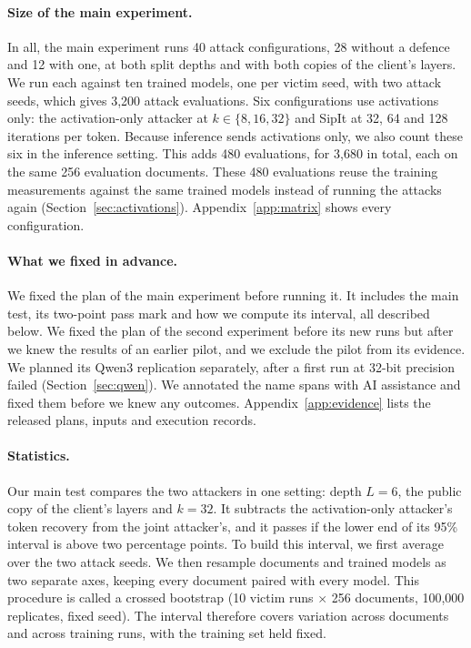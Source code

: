 \documentclass[11pt]{article}
\begin{document}
\paragraph{Size of the main experiment.}
In all, the main experiment runs 40 attack configurations, 28 without a defence and 12 with one, at both split depths and with both copies of the client's layers. We run each against ten trained models, one per victim seed, with two attack seeds, which gives 3{,}200 attack evaluations. Six configurations use activations only: the activation-only attacker at $k \in \{8, 16, 32\}$ and SipIt at 32, 64 and 128 iterations per token. Because inference sends activations only, we also count these six in the inference setting. This adds 480 evaluations, for 3{,}680 in total, each on the same 256 evaluation documents. These 480 evaluations reuse the training measurements against the same trained models instead of running the attacks again (Section~\ref{sec:activations}). Appendix~\ref{app:matrix} shows every configuration.

\paragraph{What we fixed in advance.}
We fixed the plan of the main experiment before running it. It includes the main test, its two-point pass mark and how we compute its interval, all described below. We fixed the plan of the second experiment before its new runs but after we knew the results of an earlier pilot, and we exclude the pilot from its evidence. We planned its Qwen3 replication separately, after a first run at 32-bit precision failed (Section~\ref{sec:qwen}). We annotated the name spans with AI assistance and fixed them before we knew any outcomes. Appendix~\ref{app:evidence} lists the released plans, inputs and execution records.

\paragraph{Statistics.}
Our main test compares the two attackers in one setting: depth $L{=}6$, the public copy of the client's layers and $k{=}32$. It subtracts the activation-only attacker's token recovery from the joint attacker's, and it passes if the lower end of its 95\% interval is above two percentage points. To build this interval, we first average over the two attack seeds. We then resample documents and trained models as two separate axes, keeping every document paired with every model. This procedure is called a crossed bootstrap (10 victim runs $\times$ 256 documents, 100{,}000 replicates, fixed seed). The interval therefore covers variation across documents and across training runs, with the training set held fixed.
\end{document}
